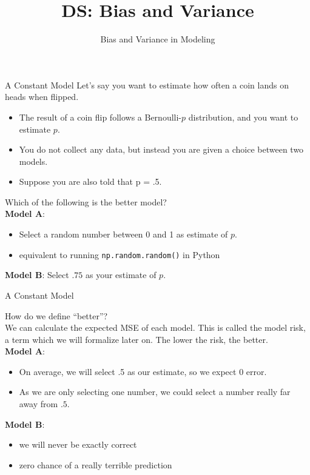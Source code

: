 \documentclass[aspectratio=169]{../latex_main/tntbeamer}  %
\title[Statistics]{DS: Bias and Variance}
\subtitle{Bias and Variance in Modeling}
\begin{document}
	
	\maketitle
	\begin{frame}{A Constant Model}
	    Let’s say you want to estimate how often a coin lands on heads when flipped.
	    \begin{itemize}
	        \item The result of a coin flip follows a Bernoulli-$p$ distribution, and you want to estimate $p$.
	        \item You do not collect any data, but instead you are given a choice between two models.
	        \item Suppose you are also told that p = .5.
	    \end{itemize}
	    Which of the following is the better model?\\
	    \bigskip
	    \textbf{Model A}: 
	    \begin{itemize}
	        \item Select a random number between 0 and 1 as estimate of $p$.
	        \item equivalent to running \texttt{np.random.random()} in Python
	     \end{itemize}
	    \bigskip
	    \textbf{Model B}: Select $.75$ as your estimate of $p$.
	\end{frame}
	
	
	\begin{frame}{A Constant Model}
	
	   How do we define \alert{“better”}?\\
	   \bigskip
	    We can calculate the expected MSE of each model. This is called the \alert{model risk}, a term which we will formalize later on. The lower the risk, the better.\\
	    \bigskip
	    \textbf{Model A}: 
	    \begin{itemize}
	        \item On average, we will select .5 as our estimate, so we \alert{expect} $0$ error.
	        \item As we are only selecting one number, we could select a number really far away from $.5$.\\
	    \end{itemize}
	    
	    \bigskip
	    \textbf{Model B}: 
	    \begin{itemize}
	        \item we will never be exactly correct
	        \item zero chance of a really terrible prediction
	    \end{itemize}
	\end{frame}
	
\end{document}
